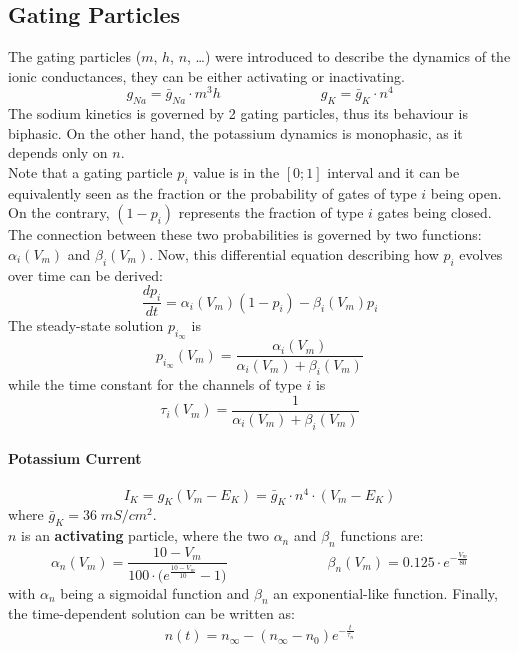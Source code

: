 \subsection{Gating Particles}
The gating particles (\(m\), \(h\), \(n\), \dots) were introduced to describe the dynamics of
the ionic conductances, they can be either activating or inactivating.
\begin{equation*}
    g_{Na}=\bar{g}_{Na}\cdot{m^{3}h}
    \hspace{3cm}
    g_{K}=\bar{g}_{K}\cdot{n^{4}}
\end{equation*}
The sodium kinetics is governed by 2 gating particles, thus its behaviour is biphasic. On the other
hand, the potassium dynamics is monophasic, as it depends only on \(n\).\\
Note that a gating particle \(p_{i}\) value is in the \([0; 1]\) interval and it can be equivalently
seen as the fraction or the probability of gates of type \(i\) being open. On the contrary,
\((1-p_{i})\) represents the fraction of type \(i\) gates being closed.\\
The connection between these two probabilities is governed by two functions:
\(\alpha_{i}(V_{m})\) and \(\beta_{i}(V_{m})\).
Now, this differential equation describing how \(p_{i}\) evolves over time can be derived:
\begin{equation*}
    \frac{dp_{i}}{dt}=\alpha_{i}(V_{m})(1-p_{i})-\beta_{i}(V_{m})p_{i}
\end{equation*}
The steady-state solution \(p_{i_{\infty}}\) is
\begin{equation*}
    p_{i_{\infty}}(V_{m})=\frac{\alpha_{i}(V_{m})}{\alpha_{i}(V_{m})+\beta_{i}(V_{m})}
\end{equation*}
while the time constant for the channels of type \(i\) is
\begin{equation*}
    \tau_{i}(V_{m})=\frac{1}{\alpha_{i}(V_{m})+\beta_{i}(V_{m})}
\end{equation*}
\paragraph{Potassium Current}
\begin{equation*}
    I_{K}=g_{K}(V_{m}-E_{K})=\bar{g}_{K}\cdot{n^{4}}\cdot{(V_{m}-E_{K})}
\end{equation*}
where \(\bar{g}_{K}=36\;mS/cm^{2}\).\\
\(n\) is an \textbf{activating} particle, where the two \(\alpha_{n}\) and \(\beta_{n}\)
functions are:
\begin{equation*}
    \alpha_{n}(V_{m})=\frac{10-V_{m}}{100\cdot\bigl(e^{\frac{10-V_{m}}{10}}-1\bigr)}
    \hspace{3cm}
    \beta_{n}(V_{m})=0.125\cdot{e^{-\frac{V_{m}}{80}}}
\end{equation*}
with \(\alpha_{n}\) being a sigmoidal function and \(\beta_{n}\) an exponential-like function.
Finally, the time-dependent solution can be written as:
\begin{equation*}
    n(t)=n_{\infty}-(n_{\infty}-n_{0})e^{-\frac{t}{\tau_{n}}}
\end{equation*}
